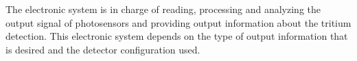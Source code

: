 The electronic system is in charge of reading, processing and analyzing the output signal of photosensors and providing output information about the tritium detection. This electronic system depends on the type of output information that is desired and the detector configuration used.


 